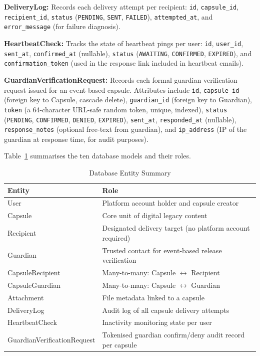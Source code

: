\documentclass[12pt, a4paper]{article}
\begin{document}
\textbf{DeliveryLog:} Records each delivery attempt per recipient: \texttt{id}, \texttt{capsule\_id}, \texttt{recipient\_id}, \texttt{status} (\texttt{PENDING}, \texttt{SENT}, \texttt{FAILED}), \texttt{attempted\_at}, and \texttt{error\_message} (for failure diagnosis).

\textbf{HeartbeatCheck:} Tracks the state of heartbeat pings per user: \texttt{id}, \texttt{user\_id}, \texttt{sent\_at}, \texttt{confirmed\_at} (nullable), \texttt{status} (\texttt{AWAITING}, \texttt{CONFIRMED}, \texttt{EXPIRED}), and \texttt{confirmation\_token} (used in the response link included in heartbeat emails).

\textbf{GuardianVerificationRequest:} Records each formal guardian verification request issued for an event-based capsule. Attributes include \texttt{id}, \texttt{capsule\_id} (foreign key to Capsule, cascade delete), \texttt{guardian\_id} (foreign key to Guardian), \texttt{token} (a 64-character URL-safe random token, unique, indexed), \texttt{status} (\texttt{PENDING}, \texttt{CONFIRMED}, \texttt{DENIED}, \texttt{EXPIRED}), \texttt{sent\_at}, \texttt{responded\_at} (nullable), \texttt{response\_notes} (optional free-text from guardian), and \texttt{ip\_address} (IP of the guardian at response time, for audit purposes).

Table~\ref{tab:db_summary} summarises the ten database models and their roles.

\begin{table}[H]
  \centering
  \caption{Database Entity Summary}
  \label{tab:db_summary}
  \begin{tabularx}{\textwidth}{|l|X|}
  \hline
  \textbf{Entity} & \textbf{Role} \\
  \hline
  User & Platform account holder and capsule creator \\
  \hline
  Capsule & Core unit of digital legacy content \\
  \hline
  Recipient & Designated delivery target (no platform account required) \\
  \hline
  Guardian & Trusted contact for event-based release verification \\
  \hline
  CapsuleRecipient & Many-to-many: Capsule $\leftrightarrow$ Recipient \\
  \hline
  CapsuleGuardian & Many-to-many: Capsule $\leftrightarrow$ Guardian \\
  \hline
  Attachment & File metadata linked to a capsule \\
  \hline
  DeliveryLog & Audit log of all capsule delivery attempts \\
  \hline
  HeartbeatCheck & Inactivity monitoring state per user \\
  \hline
  GuardianVerificationRequest & Tokenised guardian confirm/deny audit record per capsule \\
  \hline
  \end{tabularx}
\end{table}
\end{document}
